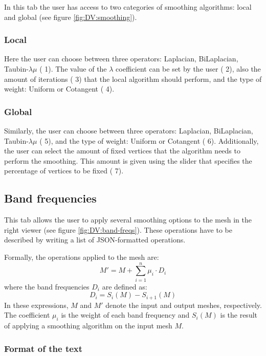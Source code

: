 \documentclass[12pt]{article}
\newcommand \elem[1] {{\color{red} #1}}
\begin{document}
In this tab the user has access to two categories of smoothing algorithms:
local and global (see figure \ref{fig:DV:smoothing}).

\subsubsection{Local}
Here the user can choose between three operators: Laplacian, BiLaplacian,
Taubin-$\lambda\mu$ (\elem{1}). The value of the $\lambda$ coefficient
can be set by the user (\elem{2}), also the amount of iterations (\elem{3})
that the local algorithm should perform, and the type of weight: Uniform or Cotangent
(\elem{4}).

\subsubsection{Global}
Similarly, the user can choose between three operators: Laplacian,
BiLaplacian, Taubin-$\lambda\mu$ (\elem{5}), and the type of weight: Uniform or
Cotangent (\elem{6}). Additionally, the user can select the amount of
fixed vertices that the algorithm needs to perform the smoothing. This
amount is given using the slider that specifies the percentage of vertices
to be fixed (\elem{7}).

\subsection{Band frequencies}
\label{sec:dual-view:band-frequencies}

This tab allows the user to apply several smoothing options to the mesh
in the right viewer (see figure \ref{fig:DV:band-freqs}). These operations
have to be described by writing a list of JSON-formatted operations.

\hfill

Formally, the operations applied to the mesh are:
\[
M' = M + \sum_{i=1}^n \mu_i \cdot D_i
\]
where the band frequencies $D_i$ are defined as:
\[
D_i = S_i(M) - S_{i + 1}(M)
\]
In these expressions, $M$ and $M'$ denote the input and output meshes,
respectively. The coefficient $\mu_i$ is the weight of each band frequency
and $S_i(M)$ is the result of applying a smoothing algorithm on the input
mesh $M$.

\subsubsection{Format of the text}
\end{document}
